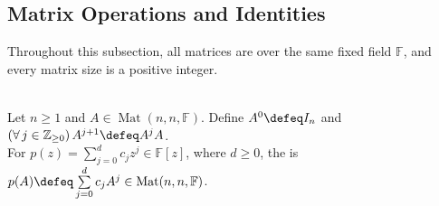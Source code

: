 \subsection{Matrix Operations and Identities}
Throughout this subsection, all matrices are over the same fixed field $\mathbb{F}$, and every matrix size is a positive integer.

\begin{definition} \label{def:polynomial-evaluation-on-square-matrix} \\
Let $n\geq1$ and $A\in\operatorname{Mat}(n,n,\mathbb{F})$. Define $A^0\defeq I_n$ and $(\forall\,j\in\mathbb{Z}_{\geq0})\,A^{j+1}\defeq A^jA$.\\
For $p(z)=\sum\limits_{j=0}^{d}c_jz^j\in\mathbb{F}[z]$, where $d\geq0$, the  is $p(A)\defeq\sum\limits_{j=0}^{d}c_jA^j\in\operatorname{Mat}(n,n,\mathbb{F})$.
\end{definition}

